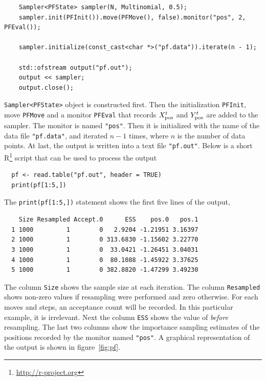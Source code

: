 \begin{Verbatim}
    Sampler<PFState> sampler(N, Multinomial, 0.5);
    sampler.init(PFInit()).move(PFMove(), false).monitor("pos", 2, PFEval());

    sampler.initialize(const_cast<char *>("pf.data")).iterate(n - 1);

    std::ofstream output("pf.out");
    output << sampler;
    output.close();
\end{Verbatim}
\verb|Sampler<PFState>| object is constructed first. Then the initialization
\verb|PFInit|, move \verb|PFMove| and a monitor \verb|PFEval| that records
$X_{\mathrm{pos}}^t$ and $Y_{\mathrm{pos}}^t$ are added to the sampler. The monitor is named
\verb|"pos"|. Then it is initialized with the name of the data file
\verb|"pf.data"|, and iterated $n - 1$ times, where $n$ is the number of data
points. At last, the output is written into a text file \verb|"pf.out"|. Below
is a short R\footnote{\url{http://r-project.org}} script that can be used to
process the output
\begin{Verbatim}
  pf <- read.table("pf.out", header = TRUE)
  print(pf[1:5,])
\end{Verbatim}
The \verb|print(pf[1:5,])| statement shows the first five lines of the output,
\begin{Verbatim}
    Size Resampled Accept.0      ESS    pos.0   pos.1
  1 1000         1        0   2.9204 -1.21951 3.16397
  2 1000         1        0 313.6830 -1.15602 3.22770
  3 1000         1        0  33.0421 -1.26451 3.04031
  4 1000         1        0  80.1088 -1.45922 3.37625
  5 1000         1        0 382.8820 -1.47299 3.49230
\end{Verbatim}
The column \verb|Size| shows the sample size at each iteration. The column
\verb|Resampled| shows non-zero values if resampling were performed and zero
otherwise. For each moves and \mcmc steps, an acceptance count will be
recorded. In this particular example, it is irrelevant. Next the column
\verb|ESS| shows the value of \ess \emph{before} resampling. The last two
columns show the importance sampling estimates of the positions recorded by the
monitor named \verb|"pos"|. A graphical representation of the output is shown
in figure~\ref{fig:pf}.


